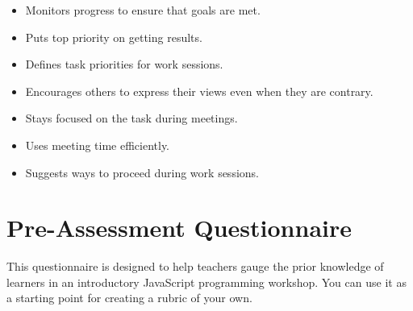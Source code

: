 \begin{itemize}
  \begin{itemize}
  \tightlist
  \item
    Monitors progress to ensure that goals are met.
  \item
    Puts top priority on getting results.
  \item
    Defines task priorities for work sessions.
  \item
    Encourages others to express their views even when they are contrary.
  \item
    Stays focused on the task during meetings.
  \item
    Uses meeting time efficiently.
  \item
    Suggests ways to proceed during work sessions.
  \end{itemize}
\end{itemize}

\chapter{Pre-Assessment Questionnaire}\label{s:preassess}

This questionnaire is designed to help teachers gauge the prior
knowledge of learners in an introductory JavaScript programming
workshop. You can use it as a starting point for creating a rubric of
your own.

